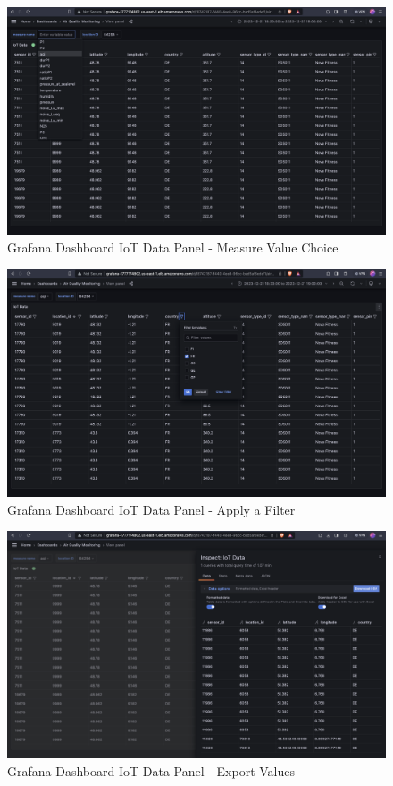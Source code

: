 \documentclass[12pt,oneside]{book} %
\begin{document}
\begin{figure}[H]
    \centering
    \includegraphics[width=1\linewidth]{images/measure-value.png}
    \caption{Grafana Dashboard IoT Data Panel - Measure Value Choice}\label{fig:grafana-iot-data-panel-measure-value}
\end{figure}

\begin{figure}[H]
    \centering
    \includegraphics[width=1\linewidth]{images/filter.png}
    \caption{Grafana Dashboard IoT Data Panel - Apply a Filter}\label{fig:grafana-iot-data-panel-filter}
\end{figure}

\begin{figure}[H]
    \centering
    \includegraphics[width=1\linewidth]{images/export-2.png}
    \caption{Grafana Dashboard IoT Data Panel - Export Values}\label{fig:grafana-iot-data-panel-export}
\end{figure}
\end{document}
